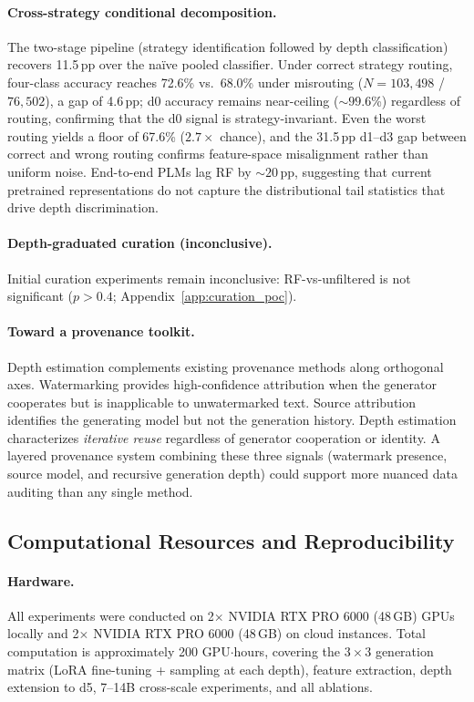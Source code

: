 \paragraph{Cross-strategy conditional decomposition.}
The two-stage pipeline (strategy identification followed by depth classification) recovers 11.5\,pp over the na\"ive pooled classifier.
Under correct strategy routing, four-class accuracy reaches 72.6\% vs.\ 68.0\% under misrouting ($N{=}103{,}498$ / $76{,}502$), a gap of 4.6\,pp; d0 accuracy remains near-ceiling (${\sim}99.6$\%) regardless of routing, confirming that the d0 signal is strategy-invariant.
Even the worst routing yields a floor of 67.6\% ($2.7\times$ chance), and the 31.5\,pp d1--d3 gap between correct and wrong routing confirms feature-space misalignment rather than uniform noise.
End-to-end PLMs lag RF by ${\sim}20$\,pp, suggesting that current pretrained representations do not capture the distributional tail statistics that drive depth discrimination.

\paragraph{Depth-graduated curation (inconclusive).}
Initial curation experiments remain inconclusive: RF-vs-unfiltered is not significant ($p>0.4$; Appendix~\ref{app:curation_poc}).

\paragraph{Toward a provenance toolkit.}
Depth estimation complements existing provenance methods along orthogonal axes.
Watermarking \cite{kirchenbauer2023_watermark} provides high-confidence attribution when the generator cooperates but is inapplicable to unwatermarked text.
Source attribution \cite{uchendu2020_attribution} identifies the generating model but not the generation history.
Depth estimation characterizes \emph{iterative reuse} regardless of generator cooperation or identity.
A layered provenance system combining these three signals (watermark presence, source model, and recursive generation depth) could support more nuanced data auditing than any single method.

\subsection{Computational Resources and Reproducibility}
\label{app:compute}

\paragraph{Hardware.}
All experiments were conducted on 2$\times$ NVIDIA RTX PRO 6000 (48\,GB) GPUs locally and 2$\times$ NVIDIA RTX PRO 6000 (48\,GB) on cloud instances.
Total computation is approximately 200 GPU$\cdot$hours, covering the $3 \times 3$ generation matrix (LoRA fine-tuning + sampling at each depth), feature extraction, depth extension to d5, 7--14B cross-scale experiments, and all ablations.


